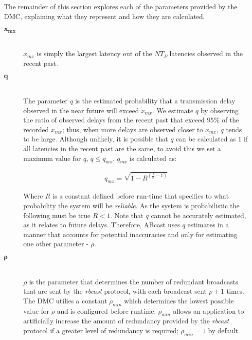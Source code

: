         The remainder of this section explores each of the parameters provided by the DMC, explaining what they represent and how they are calculated.  
        
        \begin{description}
        \item[\Huge$\boldsymbol{x_{mx}}$] \hfill \\
        $x_{mx}$ is simply the largest latency out of the $NT_P$ latencies observed in the recent past.  
        
        \item[\Huge$\boldsymbol{q}$] \hfill \\
                The parameter $q$ is the estimated probability that a transmission delay observed in the near future will exceed $x_{mx}$.  We estimate $q$ by observing the ratio of observed delays from the recent past that exceed $95\%$ of the recorded $x_{mx}$; thus, when more delays are observed closer to $x_{mx}$, $q$ tends to be large.  Although unlikely, it is possible that $q$ can be calculated as $1$ if all latencies in the recent past are the same, to avoid this we set a maximum value for $q$, $ q \leq q_{mx}$.  $q_{mx}$ is calculated as: 

        \begin{equation*}
             \begin{aligned}
                  q_{mx} = \sqrt{1 - R^{(\frac{1}{n} - 1)}}
             \end{aligned}
        \end{equation*}
        
        Where $R$ is a constant defined before run-time that specifies to what probability the system will be \emph{reliable}.  As the system is probabilistic the following must be true $R < 1$.  Note that $q$ cannot be accurately estimated, as it relates to future delays.  Therefore, \textsf{ABcast} uses $q$ estimates in a manner that accounts for potential inaccuracies and only for estimating one other parameter - $\rho$.
    
        \item[\Huge$\boldsymbol{\rho}$] \hfill \\
        $\rho$ is the parameter that determines the number of redundant broadcasts that are sent by the \emph{rbcast} protocol, with each broadcast sent $\rho + 1$ times.  The DMC utilies a constant $\rho_{min}$ which determines the lowest possible value for $\rho$ and is configured before runtime.  $\rho_{min}$ allows an application to artificially increase the amount of redundancy provided by the \emph{rbcast} protocol if a greater level of redundancy is required; $\rho_{min} = 1$ by default.
        

\end{description}
